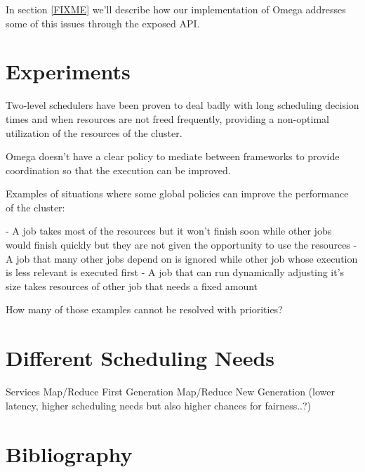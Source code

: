 \documentclass{svjour3}                     %
\begin{document}

In section \ref{FIXME}  we'll describe how our implementation of Omega
addresses some of this issues through the exposed API.

\section{Experiments}
Two-level schedulers have been proven to deal badly with long scheduling decision times and
when resources are not freed frequently, providing a non-optimal utilization of the resources
of the cluster.

Omega doesn't have a clear policy to mediate between frameworks to provide coordination so 
that the execution can be improved.

Examples of situations where some global policies can improve the performance of the cluster:

 - A job takes most of the resources but it won't finish soon while other jobs would finish
   quickly but they are not given the opportunity to use the resources
 - A job that many other jobs depend on is ignored while other job whose execution is less
   relevant is executed first
 - A job that can run dynamically adjusting it's size takes resources of other job that needs
  a fixed amount

How many of those examples cannot be resolved with priorities? 

\section{Different Scheduling Needs}

Services
Map/Reduce First Generation
Map/Reduce New Generation (lower latency, higher scheduling needs but also higher
chances for fairness..?)


\section{Bibliography}


\printbibliography



\end{document}
